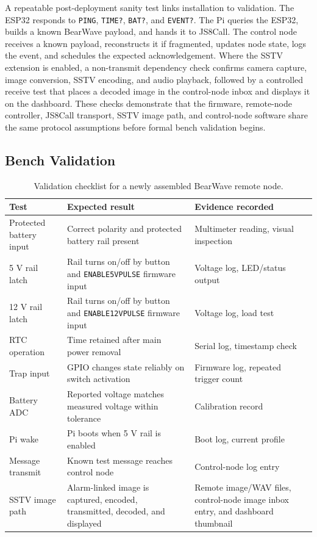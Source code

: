 \documentclass[acmsmall,screen]{acmart}
\begin{document}
A repeatable post-deployment sanity test links installation to validation. The ESP32 responds to \texttt{PING}, \texttt{TIME?}, \texttt{BAT?}, and \texttt{EVENT?}. The Pi queries the ESP32, builds a known BearWave payload, and hands it to JS8Call. The control node receives a known payload, reconstructs it if fragmented, updates node state, logs the event, and schedules the expected acknowledgement. Where the SSTV extension is enabled, a non-transmit dependency check confirms camera capture, image conversion, SSTV encoding, and audio playback, followed by a controlled receive test that places a decoded image in the control-node inbox and displays it on the dashboard. These checks demonstrate that the firmware, remote-node controller, JS8Call transport, SSTV image path, and control-node software share the same protocol assumptions before formal bench validation begins.

\subsection{Bench Validation}
\begin{table}[tbp]
\centering
\caption{Validation checklist for a newly assembled BearWave remote node.}
\label{tab:validation-checklist}
\begin{tabularx}{\textwidth}{p{}p{}X}
\toprule
Test & Expected result & Evidence recorded \\
\midrule
Protected battery input & Correct polarity and protected battery rail present & Multimeter reading, visual inspection \\
5 V rail latch & Rail turns on/off by button and \texttt{ENABLE5VPULSE} firmware input & Voltage log, LED/status output \\
12 V rail latch & Rail turns on/off by button and \texttt{ENABLE12VPULSE} firmware input & Voltage log, load test \\
RTC operation & Time retained after main power removal & Serial log, timestamp check \\
Trap input & GPIO changes state reliably on switch activation & Firmware log, repeated trigger count \\
Battery ADC & Reported voltage matches measured voltage within tolerance & Calibration record \\
Pi wake & Pi boots when 5 V rail is enabled & Boot log, current profile \\
Message transmit & Known test message reaches control node & Control-node log entry \\
SSTV image path & Alarm-linked image is captured, encoded, transmitted, decoded, and displayed & Remote image/WAV files, control-node image inbox entry, and dashboard thumbnail \\
\bottomrule
\end{tabularx}
\end{table}
\end{document}
